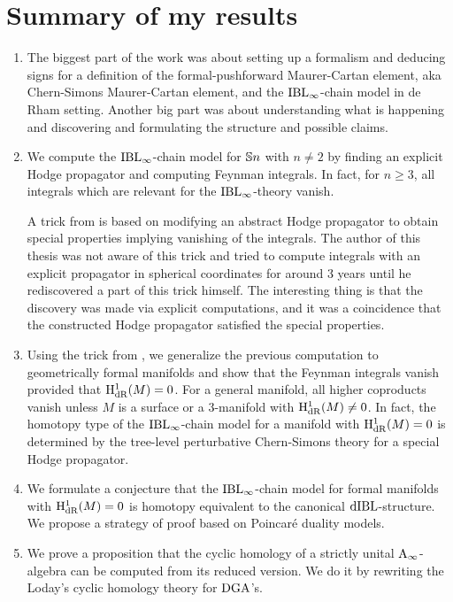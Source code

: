 \documentclass[\MainFolder/Text.tex]{subfiles}
\begin{document}
\section{Summary of my results}

\begin{enumerate}[label=\arabic*)]

\item The biggest part of the work was about setting up a formalism and deducing signs for a definition of the formal-pushforward Maurer-Cartan element, aka Chern-Simons Maurer-Cartan element, and the $\mathrm{IBL}_\infty$-chain model in de Rham setting. Another big part was about understanding what is happening and discovering and formulating the structure and possible claims.

\item We compute the $\mathrm{IBL}_\infty$-chain model for $\mathbb{S}{n}$ with $n\neq 2$ by finding an explicit Hodge propagator and computing Feynman integrals. In fact, for $n\ge 3$, all integrals which are relevant for the $\mathrm{IBL}_\infty$-theory vanish.
 
A trick from \cite{Mnev2009} is based on modifying an abstract Hodge propagator to obtain special properties implying vanishing of the integrals. The author of this thesis was not aware of this trick and tried to compute integrals with an explicit propagator in spherical coordinates for around 3 years until he rediscovered a part of this trick himself. The interesting thing is that the discovery was made via explicit computations, and it was a coincidence that the constructed Hodge propagator satisfied the special properties.
 
\item Using the trick from \cite{Mnev2009}, we generalize the previous computation to geometrically formal manifolds and show that the Feynman integrals vanish provided that $\mathrm{H}_{\mathrm{dR}}^1(M) = 0$. For a general manifold, all higher coproducts vanish unless $M$ is a surface or a $3$-manifold with $\mathrm{H}_{\mathrm{dR}}^1(M) \neq 0$. In fact, the homotopy type of the $\mathrm{IBL}_\infty$-chain model for a manifold with $\mathrm{H}_{\mathrm{dR}}^1(M) = 0$ is determined by the tree-level perturbative Chern-Simons theory for a special Hodge propagator.

\item We formulate a conjecture that the $\mathrm{IBL}_\infty$-chain model for formal manifolds with $\mathrm{H}_{\mathrm{dR}}^1(M) = 0$ is homotopy equivalent to the canonical $\mathrm{dIBL}$-structure. We propose a strategy of proof based on Poincar\'e duality models.
 
\item We prove a proposition that the cyclic homology of a strictly unital $\mathrm{A}_\infty$-algebra can be computed from its reduced version. We do it by rewriting the Loday's cyclic homology theory for $\mathrm{DGA}$'s.


\end{enumerate}
\end{document}
